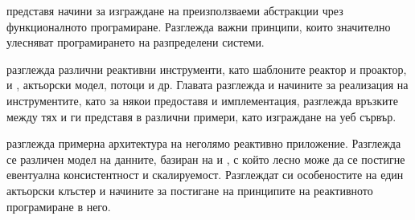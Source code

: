  представя начини за изграждане на преизползваеми абстракции чрез функционалното програмиране. Разглежда важни принципи, които значително улесняват програмирането на разпределени системи.

 разглежда различни реактивни инструменти, като шаблоните реактор и проактор,  и , актьорски модел, потоци и др. Главата разглежда и начините за реализация на инструментите, като за някои предоставя и имплементация, разглежда връзките между тях и ги представя в различни примери, като изграждане на уеб сървър.

 разглежда примерна архитектура на неголямо реактивно приложение. Разглежда се различен модел на данните, базиран на  и , с който лесно може да се постигне евентуална консистентност и скалируемост. Разглеждат си особеностите на един актьорски клъстер и начините за постигане на принципите на реактивното програмиране в него.
